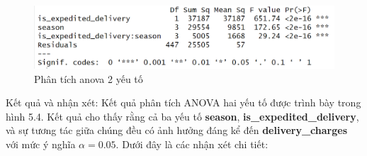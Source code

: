         \begin{figure}[!htbp]
            \centering
            \includegraphics[width=1\linewidth]{graphics/5.4.3.png}
            \caption{Phân tích anova 2 yếu tố}
        \end{figure}
        
        
        Kết quả và nhận xét: 
        Kết quả phân tích ANOVA hai yếu tố được trình bày trong hình 5.4. Kết quả cho thấy rằng cả ba yếu tố \textbf{season}, \textbf{is\_expedited\_delivery}, và sự tương tác giữa chúng đều có ảnh hưởng đáng kể đến \textbf{delivery\_charges} với mức ý nghĩa $\alpha = 0.05$. Dưới đây là các nhận xét chi tiết:
        
